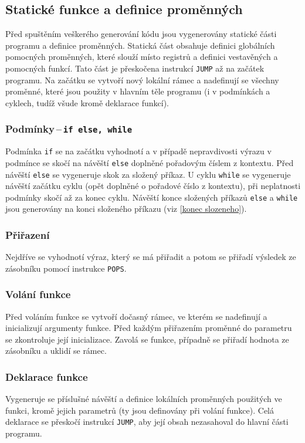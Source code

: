 \documentclass[a4paper, 12pt]{article}
\begin{document}
    \subsection{Statické funkce a definice proměnných}
    Před spuštěním veškerého generování kódu jsou vygenerovány statické části programu a definice proměnných. Statická část obsahuje definici globálních pomocných proměnných, které slouží místo registrů a definici vestavěných a pomocných funkcí. Tato část je přeskočena instrukcí \texttt{JUMP} až na začátek programu. Na začátku se vytvoří nový lokální rámec a nadefinují se všechny proměnné, které jsou použity v hlavním těle programu (i v podmínkách a cyklech, tudíž všude kromě deklarace funkcí).

    \subsubsection{Podmínky\,--\,\texttt{if else, while}}
    Podmínka \texttt{if} se na začátku vyhodnotí a v případě nepravdivosti výrazu v podmínce se skočí na návěští \texttt{else} doplněné pořadovým číslem z kontextu. Před návěští \texttt{else} se vygeneruje skok za složený příkaz. U cyklu \texttt{while} se vygeneruje návěští začátku cyklu (opět doplněné o pořadové číslo z kontextu), při neplatnosti podmínky skočí až za konec cyklu. Návěští konce složených příkazů \texttt{else} a \texttt{while} jsou generovány na konci složeného příkazu (viz \ref{konec slozeneho}).

    \subsubsection{Přiřazení}
    Nejdříve se vyhodnotí výraz, který se má přiřadit a potom se přiřadí výsledek ze zásobníku pomocí instrukce \texttt{POPS}.

    \subsubsection{Volání funkce}
    Před voláním funkce se vytvoří dočasný rámec, ve kterém se nadefinují a inicializují argumenty funkce. Před každým přiřazením proměnné do parametru se zkontroluje její inicializace. Zavolá se funkce, případně se přiřadí hodnota ze zásobníku a uklidí se rámec.

    \subsubsection{Deklarace funkce}
    Vygeneruje se příslušné návěští a definice lokálních proměnných použitých ve funkci, kromě jejich parametrů (ty jsou definovány při volání funkce). Celá deklarace se přeskočí instrukcí \texttt{JUMP}, aby její obsah nezasahoval do hlavní části programu.
\end{document}
